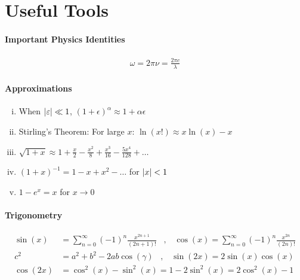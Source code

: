 \section{Useful Tools}

\paragraph{Important Physics Identities}
\begin{align*}
    \omega = 2 \pi \nu = \frac{2 \pi c}{\lambda}
\end{align*}

\paragraph{Approximations}

\begin{enumerate}[(i)]
    \item When $\left\vert \varepsilon \right\vert \ll 1$, $(1+\epsilon)^\alpha \approx 1 + \alpha \epsilon$
    \item Stirling's Theorem: For large $x$: $\ln(x!) \approx x \ln(x) - x$
    \item $\sqrt{1+x} \approx 1 + \frac{x}{2} - \frac{x^2}{8} + \frac{x^3}{16} - \frac{5 x^4}{128} + \dots$
    \item $(1+x)^{-1} = 1 - x + x^2 - \dots$ for $\left\vert x \right\vert < 1$
    \item $1-e^x = x$ for $x \rightarrow 0$
\end{enumerate}

\paragraph{Trigonometry}
\begin{align*}
    \sin(x) &= \sum_{n=0}^\infty (-1)^n \frac{x^{2n+1}}{(2n+1)!}
    \hspace{10pt} , \hspace{10pt}
    \cos(x) = \sum_{n=0}^\infty (-1)^n \frac{x^{2n}}{(2n)!}
    \\
    c^2 &= a^2 + b^2 - 2 a b \cos(\gamma)
    \hspace{10pt} , \hspace{10pt}
    \sin(2x) = 2 \sin(x) \cos(x)
    \\
    \cos(2x) &= \cos^2(x) - \sin^2(x) = 1 - 2 \sin^2(x) = 2 \cos^2(x) - 1
\end{align*}

